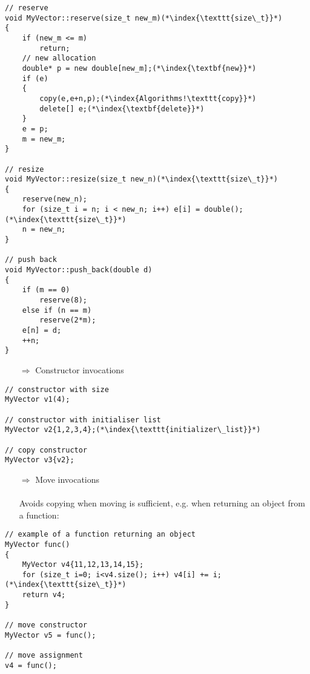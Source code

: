 \documentclass[10pt]{article}
\begin{document}
\begin{lstlisting}
// reserve
void MyVector::reserve(size_t new_m)(*\index{\texttt{size\_t}}*)
{
    if (new_m <= m)
        return;
    // new allocation
    double* p = new double[new_m];(*\index{\textbf{new}}*)
    if (e)
    {
        copy(e,e+n,p);(*\index{Algorithms!\texttt{copy}}*)
        delete[] e;(*\index{\textbf{delete}}*)
    }
    e = p;
    m = new_m;
}

// resize
void MyVector::resize(size_t new_n)(*\index{\texttt{size\_t}}*)
{
    reserve(new_n);
    for (size_t i = n; i < new_n; i++) e[i] = double();(*\index{\texttt{size\_t}}*)
    n = new_n;
}

// push back
void MyVector::push_back(double d)
{
    if (m == 0)
        reserve(8);
    else if (n == m)
        reserve(2*m);
    e[n] = d;
    ++n;
}
\end{lstlisting}
\begin{enumerate}
\item[$\Rightarrow$] Constructor invocations
\end{enumerate}
\begin{lstlisting}
// constructor with size
MyVector v1(4); 

// constructor with initialiser list
MyVector v2{1,2,3,4};(*\index{\texttt{initializer\_list}}*)

// copy constructor
MyVector v3{v2}; 
\end{lstlisting}
\begin{enumerate}
\item[$\Rightarrow$] Move invocations\\ \\ Avoids copying when moving is sufficient, e.g. when returning an object from a function:
\end{enumerate}
\begin{lstlisting}
// example of a function returning an object
MyVector func()
{
    MyVector v4{11,12,13,14,15};
    for (size_t i=0; i<v4.size(); i++) v4[i] += i;(*\index{\texttt{size\_t}}*)
    return v4;
}

// move constructor
MyVector v5 = func(); 

// move assignment
v4 = func();       
\end{lstlisting}
%
%
\end{document}
